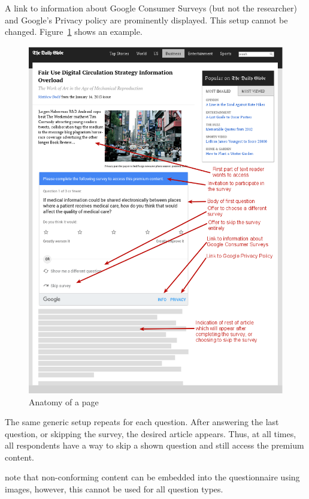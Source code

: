 A link to information about Google Consumer Surveys (but not the researcher) and Google's Privacy policy are prominently displayed. This setup cannot be changed. Figure~\ref{fig:anatomy} shows an example. 
\begin{figure}
	\includegraphics[width=\textwidth]{Selection_359.png}
	\caption{\label{fig:anatomy}Anatomy of a page}
\end{figure}
The same generic setup repeats for each question. After answering the last question, or skipping the survey, the desired article appears. Thus, at all times, all respondents have a way to skip a shown question and still access the premium content.

\cite{doi:10.1093/pan/mpw016} note that non-conforming content can be embedded into the questionnaire using images, however, this cannot be used for all question types.